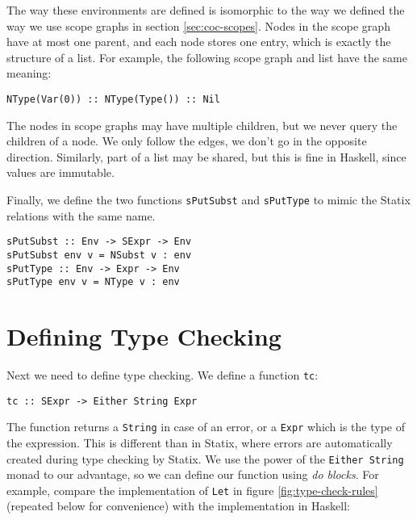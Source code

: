 The way these environments are defined is isomorphic to the way we defined the way we use scope graphs in section \ref{sec:coc-scopes}. Nodes in the scope graph have at most one parent, and each node stores one entry, which is exactly the structure of a list. For example, the following scope graph and list have the same meaning:

\begin{lstlisting}
NType(Var(0)) :: NType(Type()) :: Nil
\end{lstlisting}

The nodes in scope graphs may have multiple children, but we never query the children of a node. We only follow the edges, we don't go in the opposite direction. Similarly, part of a list may be shared, but this is fine in Haskell, since values are immutable. 

Finally, we define the two functions \verb|sPutSubst| and \verb|sPutType| to mimic the Statix relations with the same name.
\begin{lstlisting}
sPutSubst :: Env -> SExpr -> Env
sPutSubst env v = NSubst v : env
sPutType :: Env -> Expr -> Env
sPutType env v = NType v : env
\end{lstlisting}

\section{Defining Type Checking}

Next we need to define type checking. We define a function \verb|tc|:
\begin{lstlisting}
tc :: SExpr -> Either String Expr
\end{lstlisting}

The function returns a \verb|String| in case of an error, or a \verb|Expr| which is the type of the expression. This is different than in Statix, where errors are automatically created during type checking by Statix. We use the power of the \verb|Either String| monad to our advantage, so we can define our function using \emph{do blocks}. For example, compare the implementation of \verb|Let| in figure \ref{fig:type-check-rules} (repeated below for convenience) with the implementation in Haskell:

